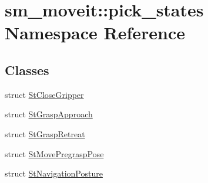 \hypertarget{namespacesm__moveit_1_1pick__states}{}\section{sm\+\_\+moveit\+:\+:pick\+\_\+states Namespace Reference}
\label{namespacesm__moveit_1_1pick__states}
\subsection*{Classes}
\begin{DoxyCompactItemize}
\item 
struct \hyperlink{structsm__moveit_1_1pick__states_1_1StCloseGripper}{St\+Close\+Gripper}
\item 
struct \hyperlink{structsm__moveit_1_1pick__states_1_1StGraspApproach}{St\+Grasp\+Approach}
\item 
struct \hyperlink{structsm__moveit_1_1pick__states_1_1StGraspRetreat}{St\+Grasp\+Retreat}
\item 
struct \hyperlink{structsm__moveit_1_1pick__states_1_1StMovePregraspPose}{St\+Move\+Pregrasp\+Pose}
\item 
struct \hyperlink{structsm__moveit_1_1pick__states_1_1StNavigationPosture}{St\+Navigation\+Posture}
\end{DoxyCompactItemize}
